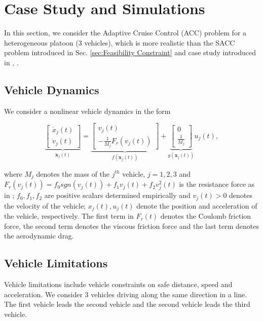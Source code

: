 \documentclass[letterpaper, 10 pt, conference]{ieeeconf}
\theoremstyle{definition}
\begin{document}
\section{Case Study and Simulations}
\label{sec:Case Study and Simulations}

In this section, we consider the Adaptive Cruise Control (ACC) problem for a heterogeneous platoon (3 vehicles), which is more realistic than the SACC problem introduced in Sec. \ref{sec:Feasibility Constraint} and case study introduced in \cite{ames2016control}, \cite{xiao2021adaptive}.
\subsection{Vehicle Dynamics}
We consider a nonlinear vehicle dynamics in the form
\begin{small}
\begin{equation}
\label{eq:ACC-dynamics}
\underbrace{\begin{bmatrix}
\dot{x}_{j}(t) \\
\dot{v}_{j}(t) 
\end{bmatrix}}_{\dot{\boldsymbol{x}}_{j}(t)}  
=\underbrace{\begin{bmatrix}
 v_{j}(t) \\
 -\frac{1}{M_{j}}F_{r}(v_{j}(t))
\end{bmatrix}}_{f(\boldsymbol{x}_{j}(t))} 
+ \underbrace{\begin{bmatrix}
  0 \\
  \frac{1}{M_{j}} 
\end{bmatrix}}_{g(\boldsymbol{x}_{j}(t))}u_{j}(t),
\end{equation}
\end{small}
where $M_{j}$ denotes the mass of the $j^{th}$ vehicle, $j=1,2,3$ and $F_{r}(v_{j}(t))=f_{0}sgn(v_{j}(t))+f_{1}v_{j}(t)+f_{2}v^{2}_{j}(t)$ is the resistance force as in \cite{Khalil:1173048};  $f_{0},f_{1},f_{2}$ are positive scalars determined empirically and $v_{j}(t)>0$ denotes the velocity of the vehicle; $x_{j}(t),u_{j}(t)$ denote the position and acceleration of the vehicle, respectively. The first term in $F_{r}(t)$ denotes the Coulomb friction force, the second term denotes the viscous friction force and the last term denotes the aerodynamic drag.

\subsection{Vehicle Limitations}
Vehicle limitations include vehicle constraints on safe distance, speed and acceleration. We consider 3 vehicles driving along the same direction in a line. The first vehicle leads the second vehicle and the second vehicle leads the third vehicle.
\end{document}
